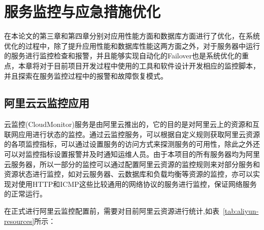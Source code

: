 \chapter{服务监控与应急措施优化}
在本论文的第三章和第四章分别对应用性能方面和数据库方面进行了优化，在系统优化的过程中，除了提升应用性能和数据库性能这两方面之外，对于服务器中运行的服务进行监控检查和报警，并且能够实现自动化的Failover也是系统优化的重点，本章将对于目前项目开发过程中使用的工具和软件设计开发相应的监控脚本，并且探索在服务监控过程中的报警和故障恢复模式\cite{刘雄辉2007服务器监控管理}。
\label{cha:Monitor}
\section{阿里云云监控应用}
云监控(CloudMonitor)服务是由阿里云推出的，它的目的是对阿里云上的资源和互联网应用进行状态的监控。通过云监控服务，可以根据自定义规则获取阿里云资源的各项监控指标，可以通过设置服务的访问方式来探测服务的可用性，除此之外还可以对监控指标设置报警并及时通知运维人员。由于本项目的所有服务器均为阿里云服务器，所以一部分的监控可以通过配置阿里云资源的监控规则来对部分服务和资源状态进行监控，如对云服务器、云数据库和负载均衡等资源的监控，亦可以实现对使用HTTP和ICMP这些比较通用的网络协议的服务进行监控，保证网络服务的正常运行\cite{梁宇2014基于}。

在正式进行阿里云监控配置前，需要对目前阿里云资源进行统计,如表~\ref{tab:aliyun-resources}所示：

